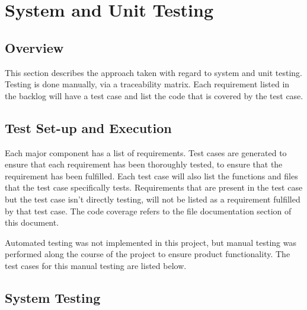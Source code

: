 

\chapter{System  and Unit Testing}

\section{Overview}
This section describes the approach taken with regard to system and unit testing. Testing is done manually, via a traceability matrix. Each requirement listed in the backlog will have a test case and list the code that is covered by the test case.  

\section{Test Set-up and Execution}
Each major component has a list of requirements. Test cases are generated to ensure that each requirement has been thoroughly tested, to ensure that the requirement has been fulfilled. Each test case will also list the functions and files that the test case specifically tests. Requirements that are present in the test case but the test case isn't directly testing, will not be listed as a requirement fulfilled by that test case. The code coverage refers to the file documentation section of this document.

Automated testing was not implemented in this project, but manual testing was performed along the course of the project to ensure product functionality. The test cases for this manual testing are listed below.

\section{System Testing}


